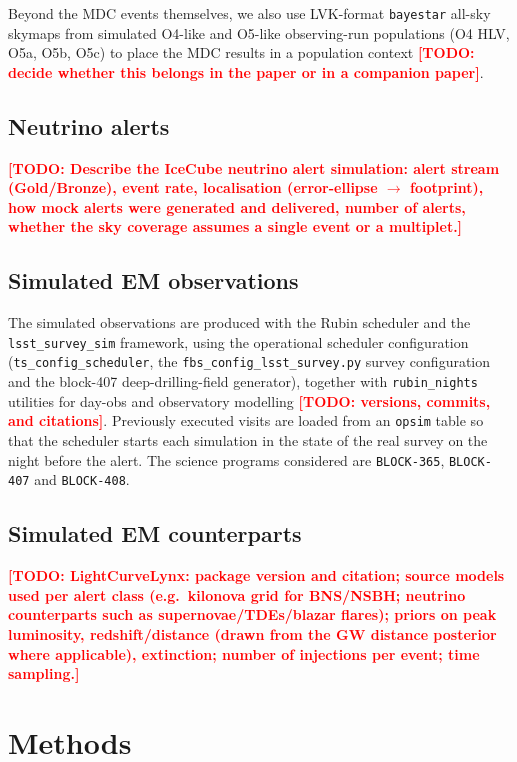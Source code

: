 \documentclass[OPS,lsstdraft,authoryear,toc]{lsstdoc}
\newcommand{\todo}[1]{\textcolor{red}{\textbf{[TODO: #1]}}}
\newcommand{\mdc}{MDC\xspace}
\begin{document}
Beyond the \mdc{} events themselves, we also use LVK-format \texttt{bayestar} all-sky skymaps from simulated
O4-like and O5-like observing-run populations (O4 HLV, O5a, O5b, O5c) to place the \mdc{}
results in a population context \todo{decide whether this belongs in the paper or in a companion paper}.

\subsection{Neutrino alerts}\label{sec:data_nu}

\todo{Describe the IceCube neutrino alert simulation: alert stream (Gold/Bronze), event rate, localisation (error-ellipse $\to$ footprint), how mock alerts were generated and delivered, number of alerts, whether the sky coverage assumes a single event or a multiplet.}

\subsection{Simulated EM observations}\label{sec:data_obs}

The simulated observations are produced with the Rubin scheduler and the \texttt{lsst\_survey\_sim}
framework, using the operational scheduler configuration (\texttt{ts\_config\_scheduler}, the
\texttt{fbs\_config\_lsst\_survey.py} survey configuration and the block-407 deep-drilling-field
generator), together with \texttt{rubin\_nights} utilities for day-obs and observatory
modelling \todo{versions, commits, and citations}. Previously executed visits are loaded from
an \texttt{opsim} table so that the scheduler starts each simulation in the state of the real survey on the
night before the alert. The science programs considered are \texttt{BLOCK-365}, \texttt{BLOCK-407}
and \texttt{BLOCK-408}.

\subsection{Simulated EM counterparts}\label{sec:data_lc}

\todo{LightCurveLynx: package version and citation; source models used per alert class (e.g.\ kilonova grid for BNS/NSBH; neutrino counterparts such as supernovae/TDEs/blazar flares); priors on peak luminosity, redshift/distance (drawn from the GW distance posterior where applicable), extinction; number of injections per event; time sampling.}

\section{Methods}\label{sec:methods}
\end{document}
